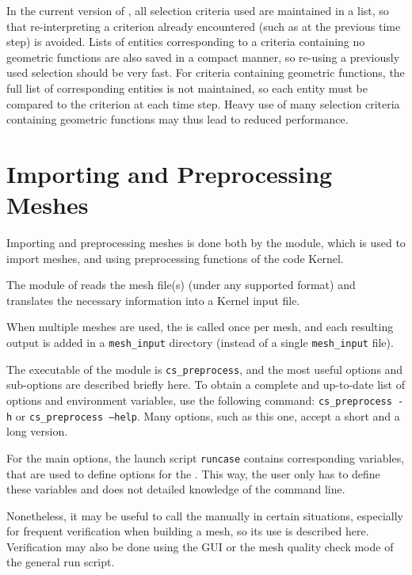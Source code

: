 {{{In the current version of \CS, all selection criteria used
are maintained in a list, so that re-interpreting a criterion already
encountered (such as at the previous time step) is avoided.
Lists of entities corresponding to a criteria containing no geometric
functions are also saved in a compact manner, so re-using a previously
used selection should be very fast. For criteria containing geometric
functions, the full list of corresponding entities is not maintained,
so each entity must be compared to the criterion at each time step.
Heavy use of many selection criteria containing geometric functions
may thus lead to reduced performance.

\section{Importing and Preprocessing Meshes}

Importing and preprocessing meshes is done both by the
\pcs module, which is used to import meshes, and using
preprocessing functions of the code Kernel.

The \pcs module of \CS reads the
mesh file(s) (under any supported format) and translates the necessary
information into a Kernel input file.

When multiple meshes are used, the \pcs is called once per mesh,
and each resulting output is added in a \texttt{mesh\_input}
directory (instead of a single \texttt{mesh\_input} file).

The executable of the \pcs module is \texttt{cs\_preprocess},
and the most useful options and sub-options are described briefly here.
To obtain a complete and up-to-date list of options and environment
variables, use the following command:
\texttt{cs\_preprocess~-h} or \texttt{cs\_preprocess~--help}. Many options,
such as this one, accept a short and a long version.

For the main options, the launch script \texttt{runcase} contains
corresponding variables, that are used to define options for the
\pcs. This way, the user only has to define these variables
and does not detailed knowledge of the \pcs command line.

Nonetheless, it may be useful to call the \pcs manually
in certain situations, especially for frequent verification when
building a mesh, so its use is described here. Verification
may also be done using the GUI or the mesh quality check mode
of the general run script.

}}}
